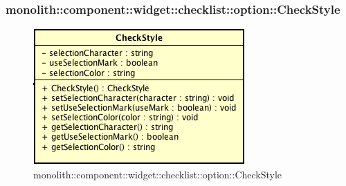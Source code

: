 \subsubsection{monolith::component::widget::checklist::option::CheckStyle}

\label{monolith::component::widget::checklist::option::CheckStyle}
\begin{figure}[H]
	\centering
	\includegraphics[scale=0.5]{Sezioni/SottosezioniST/img/CheckStyle.png}
	\caption{monolith::component::widget::checklist::option::CheckStyle}
\end{figure}

